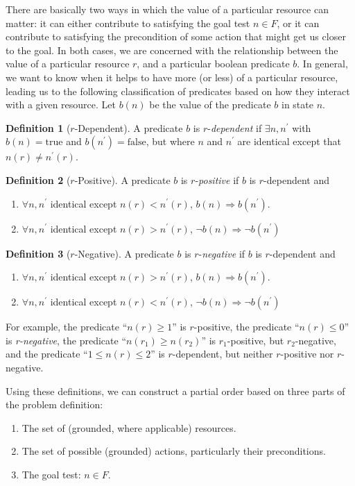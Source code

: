 \documentclass[letterpaper]{article}
\theoremstyle{plain} \newtheorem{theorem}{Theorem} \newtheorem{proposition}{Proposition} \newtheorem{lemma}{Lemma}
\theoremstyle{definition} \newtheorem{definition}{Definition} \newtheorem{conjecture}{Conjecture} \newtheorem*{example}{Example}
\theoremstyle{remark} \newtheorem*{remark}{Remark} \newtheorem*{note}{Note} \newtheorem{case}{Case}
\begin{document}
There are basically two ways in which the value of a particular resource can matter: it can
either contribute to satisfying the goal test $n \in F$, or it can contribute to satisfying
the precondition of some action that might get us closer to the
goal. In both cases, we are
concerned with the relationship between the value of a particular resource $r$, and a
particular boolean predicate $b$. In general, we want to know when it helps to have more (or less) of a particular resource, leading us to the following classification
of predicates based on how they interact with a given resource. Let $b(n)$ be the value of the predicate $b$ in state $n$.
\begin{definition}[$r$-Dependent]
A predicate $b$ is $r$-\textit{dependent} if $\exists n, n^\prime$ with $b(n) = \text{true}$ and $b(n^\prime) = \text{false}$, but where $n$ and $n^\prime$ are identical except that $n(r) \ne n^\prime(r)$.
\end{definition}
\begin{definition}[$r$-Positive]
	A predicate $b$ is $r$-\textit{positive} if $b$ is $r$-dependent and
	\begin{enumerate}
		\item $\forall n, n^\prime$ identical except $n(r) < n^\prime(r)$, $b(n) \Rightarrow b(n^\prime).$
		\item $\forall n, n^\prime$ identical except $n(r) > n^\prime(r)$, $\neg b(n) \Rightarrow \neg b(n^\prime)$
	\end{enumerate}
\end{definition}
\begin{definition}[$r$-Negative]
	A predicate $b$ is $r$-\textit{negative} if $b$ is $r$-dependent and
	\begin{enumerate}
		\item $\forall n, n^\prime$ identical except $n(r) > n^\prime(r)$, $b(n) \Rightarrow b(n^\prime).$
		\item $\forall n, n^\prime$ identical except $n(r) < n^\prime(r)$, $\neg b(n) \Rightarrow \neg b(n^\prime)$
	\end{enumerate}
\end{definition}
For example, the predicate ``$n(r) \ge 1$'' is $r$-positive, the predicate ``$n(r) \le 0$'' is \textit{r-negative}, the predicate ``$n(r_1) \ge n(r_2)$'' is $r_1$-positive, but $r_2$-negative, and the predicate ``$1 \le n(r) \le 2$'' is $r$-dependent, but neither $r$-positive nor $r$-negative.

Using these definitions, we can construct a partial order based on three parts of the problem definition:
\begin{enumerate}
	\item The set of (grounded, where applicable) resources.
	\item The set of possible (grounded) actions, particularly their preconditions.
	\item The goal test: $n \in F$.
\end{enumerate}
\end{document}
